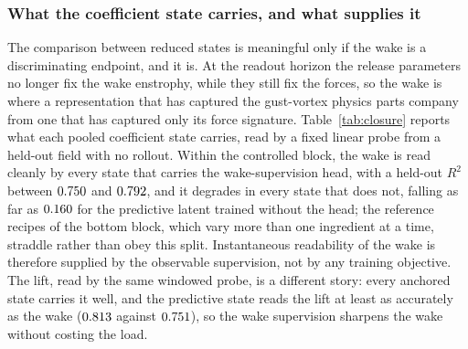 

\subsubsection{What the coefficient state carries, and what supplies it}
\label{sec:res_carries}
\label{sec:res_closure} %

The comparison between reduced states is meaningful only if the wake is a discriminating endpoint, and it is. At the readout horizon the release parameters no longer fix the wake enstrophy, while they still fix the forces, so the wake is where a representation that has captured the gust-vortex physics parts company from one that has captured only its force signature. Table~\ref{tab:closure} reports what each pooled coefficient state carries, read by a fixed linear probe from a held-out \TestSplit{} field with no rollout. Within the controlled block, the wake is read cleanly by every state that carries the wake-supervision head, with a held-out $R^2$ between $0.750$ and $0.792$, and it degrades in every state that does not, falling as far as $0.160$ for the predictive latent trained without the head; the reference recipes of the bottom block, which vary more than one ingredient at a time, straddle rather than obey this split. Instantaneous readability of the wake is therefore supplied by the observable supervision, not by any training objective. The lift, read by the same windowed probe, is a different story: every anchored state carries it well, and the predictive state reads the lift at least as accurately as the wake ($0.813$ against $0.751$), so the wake supervision sharpens the wake without costing the load.\re

